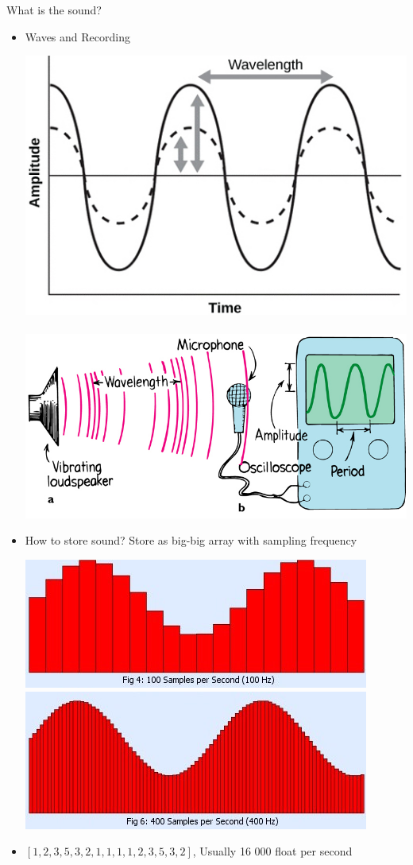 \documentclass{beamer}
\begin{document}
\begin{frame}{What is the sound?} 
	\begin{itemize}
		\item Waves and Recording
			\begin{center}		  
				\includegraphics[scale=0.25]{img/wave} ~~~ 	\includegraphics[scale=0.2]{img/sound}
			\end{center}
		\item How to store sound? Store as big-big array with sampling frequency
		\begin{center}
			\includegraphics[scale=0.35]{img/sf1}~~~~\includegraphics[scale=0.35]{img/sf2} 
		\end{center}
		\item $[1, 2, 3, 5, 3, 2, 1, 1, 1, 1, 2, 3, 5, 3, 2]$, Usually 16 000 float per second
	\end{itemize}
\end{frame}
\end{document}
